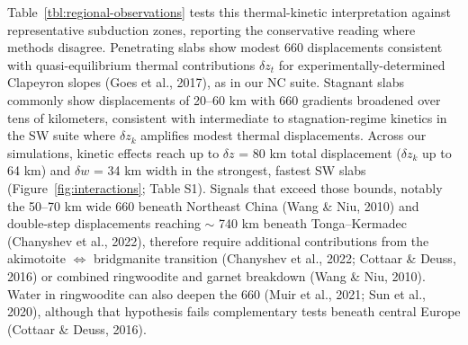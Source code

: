 \documentclass[draft,linenumbers]{agujournal2019}
\begin{document}
Table~\ref{tbl:regional-observations} tests this thermal-kinetic
interpretation against representative subduction zones, reporting the
conservative reading where methods disagree. Penetrating slabs show
modest 660 displacements consistent with quasi-equilibrium thermal
contributions \(\delta z_t\) for experimentally-determined Clapeyron
slopes ({Goes et al.}, 2017), as in our NC suite. Stagnant slabs
commonly show displacements of 20--60 km with 660 gradients broadened
over tens of kilometers, consistent with intermediate to
stagnation-regime kinetics in the SW suite where \(\delta z_k\)
amplifies modest thermal displacements. Across our simulations, kinetic
effects reach up to \(\delta z\) = 80 km total displacement
(\(\delta z_k\) up to 64 km) and \(\delta w\) = 34 km width in the
strongest, fastest SW slabs (Figure~\ref{fig:interactions}; Table S1).
Signals that exceed those bounds, notably the 50--70 km wide 660 beneath
Northeast China (Wang \& Niu, 2010) and double-step displacements
reaching \(\sim\) 740 km beneath Tonga--Kermadec ({Chanyshev et al.},
2022), therefore require additional contributions from the akimotoite
\(\Leftrightarrow\) bridgmanite transition ({Chanyshev et al.}, 2022;
Cottaar \& Deuss, 2016) or combined ringwoodite and garnet breakdown
(Wang \& Niu, 2010). Water in ringwoodite can also deepen the 660 (Muir
et al., 2021; Sun et al., 2020), although that hypothesis fails
complementary tests beneath central Europe (Cottaar \& Deuss, 2016).

\landscape
\end{document}
